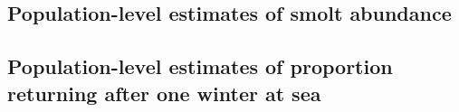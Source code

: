 \documentclass[12pt]{article}
\newcommand{\So}{$S_{1}$\xspace}
\newcommand{\St}{$S_{2}$\xspace}
\newcommand{\Pg}{$P_r$\xspace}
\begin{document}

\clearpage

\subsection*{Population-level estimates of smolt abundance}



\hspace{8em}





\clearpage

\subsection*{Population-level estimates of proportion returning after one winter at sea}



\hspace{8em}




\end{document}
